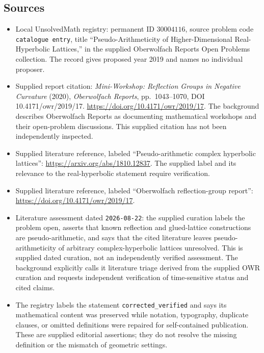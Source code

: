 \documentclass[11pt]{article}
\begin{document}
\subsection{Sources}
\begin{itemize}
\item Local UnsolvedMath registry: permanent ID \(30004116\), source problem code \texttt{catalogue entry}, title ``Pseudo-Arithmeticity of Higher-Dimensional Real-Hyperbolic Lattices,'' in the supplied Oberwolfach Reports Open Problems collection. The record gives proposed year 2019 and names no individual proposer.
\item Supplied report citation: \emph{Mini-Workshop: Reflection Groups in Negative Curvature} (2020), \emph{Oberwolfach Reports}, pp.~1043--1070, DOI 10.4171/owr/2019/17. \url{https://doi.org/10.4171/owr/2019/17}. The background describes Oberwolfach Reports as documenting mathematical workshops and their open-problem discussions. This supplied citation has not been independently inspected.
\item Supplied literature reference, labeled ``Pseudo-arithmetic complex hyperbolic lattices'': \url{https://arxiv.org/abs/1810.12837}. The supplied label and its relevance to the real-hyperbolic statement require verification.
\item Supplied literature reference, labeled ``Oberwolfach reflection-group report'': \url{https://doi.org/10.4171/owr/2019/17}.
\item Literature assessment dated \texttt{2026-08-22}: the supplied curation labels the problem open, asserts that known reflection and glued-lattice constructions are pseudo-arithmetic, and says that the cited literature leaves pseudo-arithmeticity of arbitrary complex-hyperbolic lattices unresolved. This is supplied dated curation, not an independently verified assessment. The background explicitly calls it literature triage derived from the supplied OWR curation and requests independent verification of time-sensitive status and cited claims.
\item The registry labels the statement \texttt{corrected\_verified} and says its mathematical content was preserved while notation, typography, duplicate clauses, or omitted definitions were repaired for self-contained publication. These are supplied editorial assertions; they do not resolve the missing definition or the mismatch of geometric settings.
\end{itemize}
\end{document}

